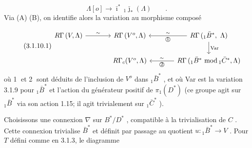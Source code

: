 \begin{equation*}
\Lambda[o] \longrightarrow \bar{\imath}^*\, {}_1\bar{\jmath}_*(\Lambda) \qquad .
\end{equation*}
Via (A) (B), on identifie alors la variation au morphisme composé

\begin{equation}\tag{3.1.10.1}
\begin{tikzcd}[column sep=large]
R\Gamma\,(V,\Lambda) \arrow[r, "\sim"] & R\Gamma\,(V^o,\Lambda) & R\Gamma\,({}_1\bar{B}^*,\ \Lambda) \arrow[l, "\sim"', "\text{\textcircled{1}}"] \arrow[d, "\mathrm{Var}"] \\
& R\Gamma_c(V^o,\Lambda) & R\Gamma\,({}_1\bar{B}^*\ \mathrm{mod}\,{}_1\bar{C}^*,\Lambda) \arrow[l, "\sim"', "\text{\textcircled{2}}"]
\end{tikzcd}
\end{equation}
où \textcircled{1} et \textcircled{2} sont déduits de l'inclusion de $V^o$ dans ${}_1\bar{B}^*$ , et où Var est la variation 3.1.9 pour ${}_1\bar{B}^*$ et l'action du générateur positif de $\pi_1(D^*)$ (ce groupe agit sur ${}_1\bar{B}^*$ via son action 1.15; il agit trivialement sur ${}_1\bar{C}^*$ ).

Choisissons une connexion $\nabla$ sur $B^*/D^*$ , compatible à la trivialisation de $C$ . Cette connexion trivialise $\bar{B}^*$ et définit par passage au quotient $u : {}_1\bar{B}^* \longrightarrow V$ . Pour $T$ défini comme en 3.1.3, le diagramme 


